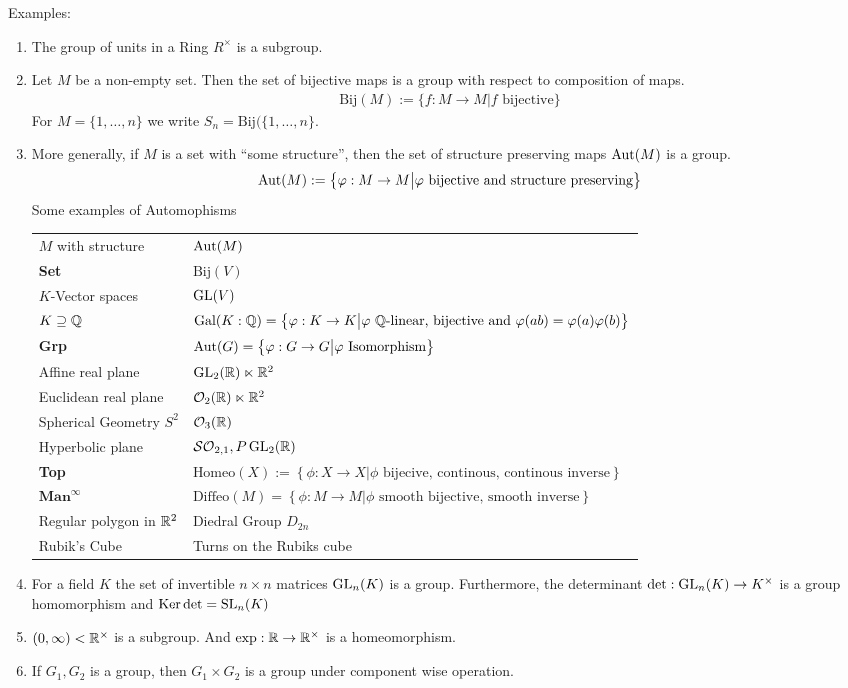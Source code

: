 Examples:
\begin{enumerate}
\item The group of units in a Ring $R^{\times}$ is a subgroup.
\item Let $M$ be a non-empty set. Then the set of bijective maps is a group with respect to composition of maps.
	\begin{align*}
		\text{Bij}(M) := \{f: M \to M \big\vert f \text{ bijective}\}
	\end{align*}
	For $M = \{1, \ldots, n\}$ we write $S_n = \text{Bij}(\{1, \ldots, n\}$.
\item More generally, if $M$ is a set with ``some structure'', then the set of structure preserving maps $\operatorname{Aut}(M)$ is a group.
	\begin{align*}
		\operatorname{Aut}(M) := \left\{\varphi: M \to M \big\vert \varphi \text{ bijective and structure preserving}\right\}
	\end{align*}
	Some examples of Automophisms\\
	\begin{tabular}{ll}
		$M$ with structure & $\operatorname{Aut}(M)$\\
		\textbf{Set} & $\text{Bij}(V)$\\
		$K$-Vector spaces & $\operatorname{GL}(V)$\\
		$K \supseteq \mathbb{Q}$ & $\text{Gal}(K:\mathbb{Q}) = \left\{\varphi: K \to K \big\vert \varphi \text{ $\mathbb{Q}$-linear, bijective and }\varphi(ab) = \varphi(a) \varphi(b)\right\}$\\
		\textbf{Grp} & $\operatorname{Aut}(G) = \left\{\varphi: G \to G \big\vert \varphi \text{ Isomorphism}\right\}$\\
		Affine real plane & $\operatorname{GL}_2(\mathbb{R}) \ltimes \mathbb{R}^2$\\
		Euclidean real plane & $\mathcal{O}_2(\mathbb{R}) \ltimes \mathbb{R}^2$\\
		Spherical Geometry $S^2$ & $\mathcal{O}_3(\mathbb{R})$\\
		Hyperbolic plane & $\mathcal{SO}_{2,1}, P \operatorname{GL}_2(\mathbb{R})$\\
		\textbf{Top} & $\text{Homeo}(X) := \left\{\phi: X \to X \big\vert \phi \text{ bijecive, continous, continous inverse}\right\}$\\
		$\textbf{Man}^\infty$ & $\text{Diffeo}(M) = \left\{\phi: M \to M \big\vert \phi \text{ smooth bijective, smooth inverse}\right\}$\\
		Regular polygon in $\mathbb{R}^2$ & Diedral Group $D_{2n}$\\
		Rubik's Cube & Turns on the Rubiks cube
	\end{tabular}
\item For a field $K$ the set of invertible $n \times n$ matrices $\operatorname{GL}_n(K)$ is a group. Furthermore, the determinant $\det: \operatorname{GL}_n(K) \to K^{\times}$ is a group homomorphism and $\operatorname{Ker} \det = \text{SL}_n(K)$
\item $(0,\infty) < \mathbb{R}^\times$ is a subgroup. And $\exp: \mathbb{R} \to \mathbb{R}^{\times}$ is a homeomorphism.
\item If $G_1, G_2$ is a group, then $G_1 \times G_2$ is a group under component wise operation.
\end{enumerate}

